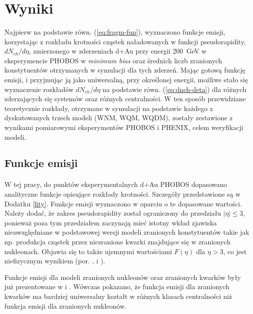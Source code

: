 \documentclass[a4paper,12pt]{article}
\begin{document}
\newpage
\section{Wyniki}
\paragraph{}
Najpierw na podstawie równ. (\ref{eq:fragm-fun}), wyznaczono funkcje emisji, korzystając z rozkładu krotności cząstek naładowanych w funkcji pseudorapidity, $dN_{ch}/d\eta$, zmierzonego w zderzeniach d+Au przy energii 200~GeV w eksperymencie PHOBOS \cite{Back:2004mr} w \textit{minimum bias} oraz średnich liczb zranionych konstytuentów otrzymanych w symulacji dla tych zderzeń. Mając gotową funkcję emisji, i przyjmując ją jako uniwersalną, przy określonej energii, możliwe stało się wyznaczenie rozkładów $dN_{ch}/d\eta$ na podstawie równ. (\ref{eq:dnch-deta}) dla różnych zderzających się systemów oraz różnych centralności. W ten sposób przewidziane teoretycznie rozkłady, otrzymane w symulacji na podstawie każdego z dyskutowanych trzech modeli (WNM, WQM, WQDM), zostały zestawione z wynikami pomiarowymi eksperymentów PHOBOS i PHENIX, celem weryfikacji modeli.


\subsection{Funkcje emisji} \label{fkcje-emisji}
\paragraph{}
W tej pracy, do punktów eksperymentalnych d+Au PHOBOS \cite{Back:2004mr} dopasowano analityczne funkcje opisujące rozkłady krotności. Szczegóły przedstawione są w Dodatku \ref{fity}. Funkcje emisji wyznaczono w oparciu o te dopasowane wartości. Należy dodać, że zakres pseudorapidity został ograniczony do przedziału $|\eta| \le 3$, ponieważ poza tym przedziałem zaczynają mieć istotny wkład zjawiska nieuwzględniane w podstawowej wersji modeli zranionych konstytuentów takie jak np. produkcja cząstek przez niezranione kwarki znajdujące się w zranionych nukleonach. Objawia się to także ujemnymi wartościami $F(\eta)$ dla $\eta > 3$, co jest niefizycznym wynikiem (por. \cite{Bialas:2006kw}, \cite{Barej:pracaInz18} i \cite{Barej:2017kcw}).

Funkcje emisji dla modeli zranionych nukleonów oraz zranionych kwarków były już prezentowane w \cite{Barej:pracaInz18} i \cite{Barej:2017kcw}. Wówczas pokazano, że funkcja emisji dla zranionych kwarków ma bardziej uniwersalny kształt w różnych klasach centralności niż funkcja emisji dla zranionych nukleonów. 
\end{document}
